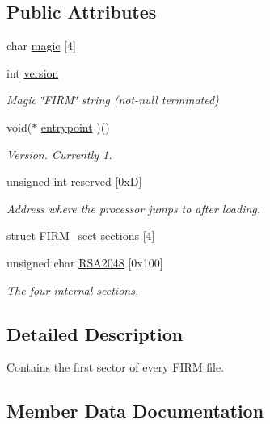 \subsection*{Public Attributes}
\begin{DoxyCompactItemize}
\item 
char \hyperlink{struct_f_i_r_m__header_a2d27c5c398bee211d2410fbdbaa5a05e}{magic} \mbox{[}4\mbox{]}
\item 
int \hyperlink{struct_f_i_r_m__header_a3a3ccecb2f6348d0071ce98d102e8a22}{version}
\begin{DoxyCompactList}\small\item\em Magic \char`\"{}\+F\+I\+R\+M\char`\"{} string (not-\/null terminated) \end{DoxyCompactList}\item 
void($\ast$ \hyperlink{struct_f_i_r_m__header_ad1612a664851fdd7f9ca671af2bfc431}{entrypoint} )()
\begin{DoxyCompactList}\small\item\em Version. Currently 1. \end{DoxyCompactList}\item 
unsigned int \hyperlink{struct_f_i_r_m__header_adc471470dba61f85b71e72ee4d84d73e}{reserved} \mbox{[}0x\+D\mbox{]}
\begin{DoxyCompactList}\small\item\em Address where the processor jumps to after loading. \end{DoxyCompactList}\item 
struct \hyperlink{struct_f_i_r_m__sect}{F\+I\+R\+M\+\_\+sect} \hyperlink{struct_f_i_r_m__header_a685b6a1c1a0cfb8fb0f1dfcba06b9741}{sections} \mbox{[}4\mbox{]}
\item 
unsigned char \hyperlink{struct_f_i_r_m__header_a7be52a7b7994c1013d02e2e9e523316b}{R\+S\+A2048} \mbox{[}0x100\mbox{]}
\begin{DoxyCompactList}\small\item\em The four internal sections. \end{DoxyCompactList}\end{DoxyCompactItemize}


\subsection{Detailed Description}
Contains the first sector of every F\+I\+R\+M file. 

\subsection{Member Data Documentation}
\hypertarget{struct_f_i_r_m__header_ad1612a664851fdd7f9ca671af2bfc431}{}
